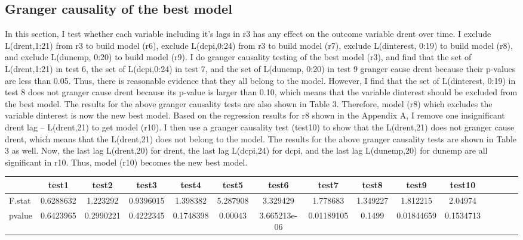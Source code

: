 \documentclass[12pt, times]{article}
\renewcommand{\baselinestretch}{1.5}
\begin{document}
\subsection{Granger causality of the best model}
In this section, I test whether each variable including it’s lags in r3 has any effect on the outcome variable drent over time. I exclude L(drent,1:21) from r3 to build model (r6), exclude L(dcpi,0:24) from r3 to build model (r7), exclude L(dinterest, 0:19) to build model (r8), and exclude L(dunemp, 0:20) to build model (r9). I do granger causality testing of the best model (r3), and find that the set of L(drent,1:21) in test 6, the set of L(dcpi,0:24) in test 7, and the set of L(dunemp, 0:20) in test 9 granger cause drent because their p-values are less than 0.05. Thus, there is reasonable evidence that they all belong to the model. However, I find that the set of L(dinterest, 0:19) in test 8 does not granger cause drent because its p-value is larger than 0.10, which means that the variable dinterest should be excluded from the best model. The results for the above granger causality tests are also shown in Table 3. Therefore, model (r8) which excludes the variable dinterest is now the new best model. Based on the regression results for r8 shown in the Appendix A, I remove one insignificant drent lag – L(drent,21) to get model (r10). I then use a granger causality test (test10) to show that the L(drent,21) does not granger cause drent, which means that the L(drent,21) does not belong to the model. The results for the above granger causality tests are shown in Table 3 as well. Now, the last lag L(drent,20) for drent, the last lag L(dcpi,24) for dcpi, and the last lag L(dunemp,20) for dunemp are all significant in r10. Thus, model (r10) becomes the new best model.

\renewcommand{\baselinestretch}{0.5}
\begin{scriptsize}
  \begin{center}
    \tabcolsep 4pt
    \begin{tabular}{lcccccccccccccc}
      \toprule
             & test1     & test2     & test3     & test4     & test5    & test6        & test7      & test8    & test9      & test10    \\
      \midrule
      F.stat & 0.6288632 & 1.223292  & 0.9396015 & 1.398382  & 5.287908 & 3.329429     & 1.778683   & 1.349227 & 1.812215   & 2.04974
      \\
      pvalue & 0.6423965 & 0.2990221 & 0.4222345 & 0.1748398 & 0.00043  & 3.665213e-06 & 0.01189105 & 0.1499   & 0.01844659 & 0.1534713 \\
      \bottomrule
    \end{tabular}
  \end{center}
\end{scriptsize}
\end{document}
